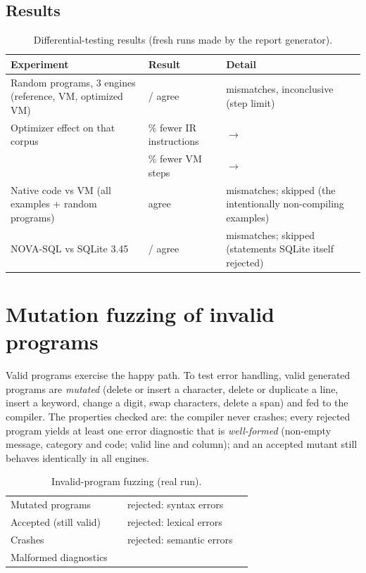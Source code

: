 \subsection{Results}
\begin{table}[H]\centering\small
\begin{tabularx}{\textwidth}{@{}p{}p{}X@{}}\toprule
\textbf{Experiment} & \textbf{Result} & \textbf{Detail}\\ \midrule
Random programs, 3 engines (reference, VM, optimized VM) & \FuzzPassed{} / \FuzzN{} agree & \FuzzFailed{} mismatches, \FuzzInconclusive{} inconclusive (step limit)\\
Optimizer effect on that corpus & \FuzzIRCut{}\% fewer IR instructions & \FuzzIRBefore{} $\to$ \FuzzIRAfter{}\\
 & \FuzzStepCut{}\% fewer VM steps & \FuzzStepsBefore{} $\to$ \FuzzStepsAfter{}\\
Native code vs VM (all examples + random programs) & \NativeDiffPass{} agree & \NativeDiffFail{} mismatches; \NativeDiffSkipped{} skipped (the intentionally non-compiling examples)\\
NOVA-SQL vs SQLite 3.45 & \SQLFuzzPass{} / \SQLFuzzTotal{} agree & \SQLFuzzFail{} mismatches; \SQLFuzzSkipped{} skipped (statements SQLite itself rejected)\\ \bottomrule
\end{tabularx}
\caption{Differential-testing results (fresh runs made by the report generator).}
\end{table}

\section{Mutation fuzzing of invalid programs}
Valid programs exercise the happy path. To test error handling, valid generated programs are \emph{mutated} (delete or insert a character, delete or duplicate a line, insert a keyword, change a digit, swap characters, delete a span) and fed to the compiler. The properties checked are: the compiler never crashes; every rejected program yields at least one error diagnostic that is \emph{well-formed} (non-empty message, category and code; valid line and column); and an accepted mutant still behaves identically in all engines.

\begin{table}[H]\centering\small
\begin{tabular}{@{}lr@{\hspace{1.5cm}}lr@{}}\toprule
Mutated programs & \InvalidN{} & rejected: syntax errors & \InvalidRejSyn{}\\
Accepted (still valid) & \InvalidAccepted{} & rejected: lexical errors & \InvalidRejLex{}\\
Crashes & \InvalidCrashes{} & rejected: semantic errors & \InvalidRejSem{}\\
Malformed diagnostics & \InvalidBadDiag{} & & \\ \bottomrule
\end{tabular}
\caption{Invalid-program fuzzing (real run).}
\end{table}

